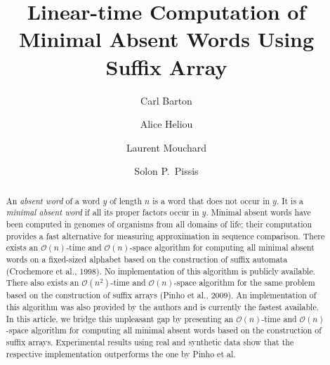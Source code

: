 \documentclass{llncs}
\newcommand{\cO}{\mathcal{O}}
\begin{document}
\frontmatter          \title{Linear-time Computation of Minimal Absent Words Using Suffix Array}

\author{Carl Barton
\and Alice Heliou
\and Laurent Mouchard
\and Solon P.\ Pissis
}


\maketitle

\begin{abstract}
  An \textit{absent word} of a word $y$ of length $n$ is a word that does not occur in $y$.
  It is a \textit{minimal absent word} if all its proper factors occur in $y$. 
  Minimal absent words have been computed in genomes of organisms from all domains of life; their computation provides a fast alternative for measuring approximation in sequence comparison.
  There exists an $\cO(n)$-time and $\cO(n)$-space algorithm for computing all minimal absent words on a fixed-sized alphabet based on the construction of suffix automata (Crochemore et al., 1998).
  No implementation of this algorithm is publicly available. There also exists an $\cO(n^2)$-time and $\cO(n)$-space algorithm for the same problem based on the construction of suffix arrays (Pinho et al., 2009). 
  An implementation of this algorithm was also provided by the authors and is currently the fastest available.
  In this article, we bridge this unpleasant gap by presenting an $\cO(n)$-time and $\cO(n)$-space algorithm for computing all minimal absent words based on the construction of suffix arrays.
  Experimental results using real and synthetic data show that the respective implementation outperforms the one by Pinho et al.
\end{abstract}
\end{document}
